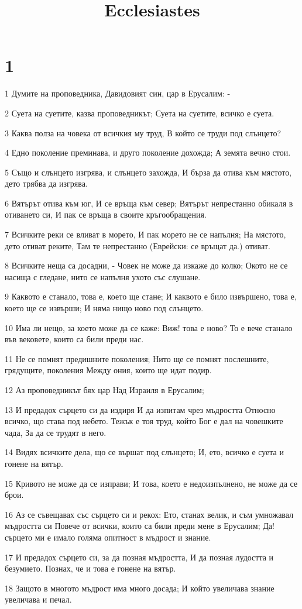 

\title{Ecclesiastes}


\chapter{1}

\par 1 Думите на проповедника, Давидовият син, цар в Ерусалим: -
\par 2 Суета на суетите, казва проповедникът; Суета на суетите, всичко е суета.
\par 3 Каква полза на човека от всичкия му труд, В който се труди под слънцето?
\par 4 Едно поколение преминава, и друго поколение дохожда; А земята вечно стои.
\par 5 Също и слънцето изгрява, и слънцето захожда, И бърза да отива към мястото, дето трябва да изгрява.
\par 6 Вятърът отива към юг, И се връща към север; Вятърът непрестанно обикаля в отиването си, И пак се връща в своите кръгообращения.
\par 7 Всичките реки се вливат в морето, И пак морето не се напълня; На мястото, дето отиват реките, Там те непрестанно (Еврейски: се връщат да.) отиват.
\par 8 Всичките неща са досадни, - Човек не може да изкаже до колко; Окото не се насища с гледане, нито се напълня ухото със слушане.
\par 9 Каквото е станало, това е, което ще стане; И каквото е било извършено, това е, което ще се извърши; И няма нищо ново под слънцето.
\par 10 Има ли нещо, за което може да се каже: Виж! това е ново? То е вече станало във вековете, които са били преди нас.
\par 11 Не се помнят предишните поколения; Нито ще се помнят послешните, грядущите, поколения Между ония, които ще идат подир.
\par 12 Аз проповедникът бях цар Над Израиля в Ерусалим;
\par 13 И предадох сърцето си да издиря И да изпитам чрез мъдростта Относно всичко, що става под небето. Тежък е тоя труд, който Бог е дал на човешките чада, За да се трудят в него.
\par 14 Видях всичките дела, що се вършат под слънцето; И, ето, всичко е суета и гонене на вятър.
\par 15 Кривото не може да се изправи; И това, което е недоизпълнено, не може да се брои.
\par 16 Аз се съвещавах със сърцето си и рекох: Ето, станах велик, и съм умножавал мъдростта си Повече от всички, които са били преди мене в Ерусалим; Да! сърцето ми е имало голяма опитност в мъдрост и знание.
\par 17 И предадох сърцето си, за да позная мъдростта, И да позная лудостта и безумието. Познах, че и това е гонене на вятър.
\par 18 Защото в многото мъдрост има много досада; И който увеличава знание увеличава и печал.

